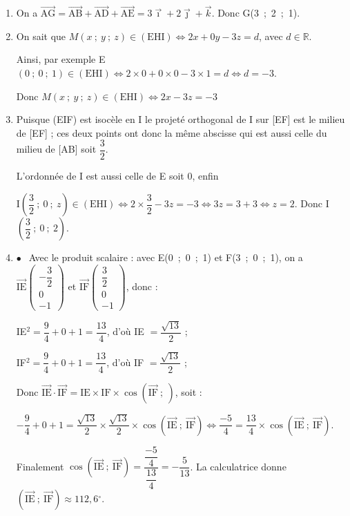 \documentclass[10pt]{article}
\providecommand{\degres}{\ensuremath{^\circ}}
\providecommand{\R}{\mathbb{R}}
\providecommand{\vect}[1]{\overrightarrow{#1}}
\providecommand{\degres}{{^\circ}}
\begin{document}
\begin{enumerate}
\item 
On a $\vect{\text{AG}} = \vect{\text{AB}} + \vect{\text{AD}} + \vect{\text{AE}} = 3\vect{\imath} + 2\vect{\jmath} + \vect{k}$. Donc G(3~;~2~;~1).
\item 


On sait que $M(x~;~y~;~z) \in (\text{EHI}) \iff 2x + 0y - 3z = d$, avec $d \in \R$.

Ainsi, par exemple  E$(0~;~0~;~1) \in (\text{EHI}) \iff 2\times 0 + 0\times 0 - 3\times 1 = d \iff d = -3$.

Donc $M(x~;~y~;~z) \in (\text{EHI}) \iff 2x  - 3z = -3$
\item 
Puisque (EIF) est isocèle en I le projeté orthogonal de I sur [EF] est le milieu de [EF] ; ces deux points ont donc la même abscisse qui est aussi celle du milieu de [AB] soit $\dfrac32$.

L'ordonnée de I est aussi celle de E soit $0$, enfin 

I$\left(\dfrac32~;~0~;~z\right) \in (\text{EHI}) \iff 2 \times \dfrac32  - 3z = - 3\iff 3z = 3 + 3 \iff z = 2$. Donc I$\left(\dfrac32~;~0~;~2\right)$.
\item 
$\bullet~~$ Avec le produit scalaire : avec E(0~;~0~;~1) et F(3~;~0~;~1), on a $\vect{\text{IE}}\begin{pmatrix}-\dfrac32\\0\\- 1\end{pmatrix}$ et $\vect{\text{IF}}\begin{pmatrix}\dfrac32\\0\\- 1\end{pmatrix}$, donc :

IE$^2 = \dfrac94 + 0 + 1 = \dfrac{13}{4}$, d'où IE $ = \dfrac{\sqrt{13}}{2}$ ;

IF$^2 = \dfrac94 + 0 + 1 = \dfrac{13}{4}$, d'où IF $ = \dfrac{\sqrt{13}}{2}$ ;

Donc $\vect{\text{IE}} \cdot \vect{\text{IF}} = \text{IE} \times \text{IF} \times \cos \left(\vect{\text{IF}}~;~ \right)$, soit :

$- \dfrac94 + 0 + 1 = \dfrac{\sqrt{13}}{2} \times \dfrac{\sqrt{13}}{2} \times \cos \left(\vect{\text{IE}}~;~ \vect{\text{IF}}\right) \iff \dfrac{-5}{4} = \dfrac{13}{4}\times \cos \left(\vect{\text{IE}}~;~ \vect{\text{IF}}\right) $.

Finalement $\cos \left(\vect{\text{IE}}~;~ \vect{\text{IF}}\right) = \dfrac{\dfrac{-5}{4}}{\dfrac{13}{4}} = - \dfrac{5}{13}$. La calculatrice donne $\left(\vect{\text{IE}}~;~ \vect{\text{IF}}\right) \approx 112,6\degres$.


\end{enumerate}
\end{document}
